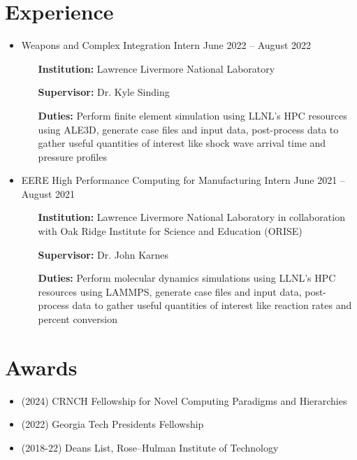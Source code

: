 \documentclass{article}
\begin{document}
\section{Experience}
\begin{itemize}
    \item Weapons and Complex Integration Intern \hfill June 2022 -- August 2022
    \begin{itemize}[leftmargin=0.875in]
        \setlength\itemsep{-0.3em}
        \item[\textbf{Institution:}] Lawrence Livermore National Laboratory
        \item[\textbf{Supervisor:}] Dr. Kyle Sinding
        \item[\textbf{Duties:}] Perform finite element simulation using LLNL's HPC resources using ALE3D, generate case files and input data, post-process data to gather useful quantities of interest like shock wave arrival time and pressure profiles
    \end{itemize}
    \item  EERE High Performance Computing for Manufacturing Intern \hfill June 2021 -- August 2021
    \begin{itemize}[leftmargin=0.875in]
        \setlength\itemsep{-0.3em}
        \item[\textbf{Institution:}] Lawrence Livermore National Laboratory in collaboration with Oak Ridge Institute for Science and Education (ORISE)
        \item[\textbf{Supervisor:}] Dr. John Karnes
        \item[\textbf{Duties:}] Perform molecular dynamics simulations using LLNL's HPC resources using LAMMPS, generate case files and input data, post-process data to gather useful quantities of interest like reaction rates and percent conversion

    \end{itemize}
\end{itemize}

\section{Awards}
\begin{itemize}
    \item (2024) CRNCH Fellowship for Novel Computing Paradigms and Hierarchies
    \item (2022) Georgia Tech Presidents Fellowship
    \item (2018-22) Deans List, Rose--Hulman Institute of Technology
\end{itemize}
\end{document}
